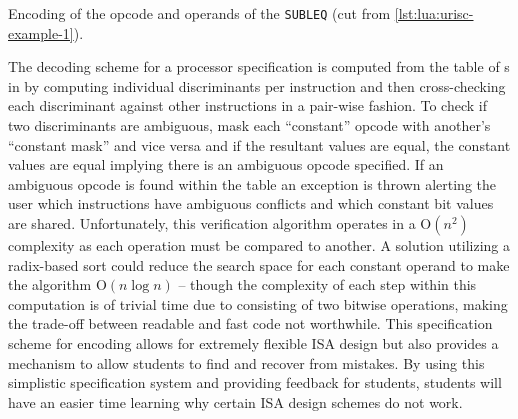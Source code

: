 \begin{listing}[h!]
    \inputminted[escapeinside=||, firstline=48, lastline=59]{lua}{./listings/urisc.lua}
    \caption{Encoding of the opcode and operands of the \texttt{SUBLEQ}  (cut from \cref{lst:lua:urisc-example-1}).}
    \label{lst:lua:urisc:encoding}
\end{listing}

The decoding scheme for a processor specification is computed from the table of s in  by computing individual discriminants per instruction and then cross-checking each discriminant against other instructions in a pair-wise fashion. To check if two discriminants are ambiguous, mask each ``constant'' opcode with another's ``constant mask'' and vice versa and if the resultant values are equal, the constant values are equal implying there is an ambiguous opcode specified. If an ambiguous opcode is found within the  table an exception is thrown alerting the user which instructions have ambiguous conflicts and which constant bit values are shared. Unfortunately, this verification algorithm operates in a $\text{O}(n^2)$ complexity as each operation must be compared to another. A solution utilizing a radix-based sort could reduce the search space for each constant operand to make the algorithm $\text{O}(n \log n)$ \cite{Goodrich2014} -- though the complexity of each step within this computation is of trivial time due to consisting of two bitwise operations, making the trade-off between readable and fast code not worthwhile. This specification scheme for encoding allows for extremely flexible ISA design but also provides a mechanism to allow students to find and recover from mistakes. By using this simplistic specification system and providing feedback for students, students will have an easier time learning why certain ISA design schemes do not work. 

